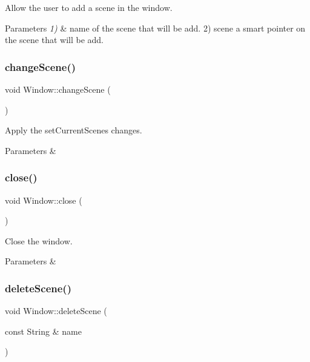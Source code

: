 Allow the user to add a scene in the window. 


\begin{DoxyParams}{Parameters}
{\em 1)} & \textquotesingle{}name\textquotesingle{} of the scene that will be add. 2) \textquotesingle{}scene\textquotesingle{} a smart pointer on the scene that will be add. \\
\hline
\end{DoxyParams}
\mbox{\label{classWindow_af1b2a635ce47d9e841445b8b866a3b28}} 
\subsubsection{\texorpdfstring{change\+Scene()}{changeScene()}}
{\footnotesize\ttfamily void Window\+::change\+Scene (\begin{DoxyParamCaption}{ }\end{DoxyParamCaption})}



Apply the set\+Current\+Scene\textquotesingle{}s changes. 


\begin{DoxyParams}{Parameters}
{\em } & \\
\hline
\end{DoxyParams}
\mbox{\label{classWindow_a35055c04498121d39741bfcd5082705b}} 
\subsubsection{\texorpdfstring{close()}{close()}}
{\footnotesize\ttfamily void Window\+::close (\begin{DoxyParamCaption}{ }\end{DoxyParamCaption})}



Close the window. 


\begin{DoxyParams}{Parameters}
{\em } & \\
\hline
\end{DoxyParams}
\mbox{\label{classWindow_ad3a1ead02eca314e2df94e3e932fb5ae}} 
\subsubsection{\texorpdfstring{delete\+Scene()}{deleteScene()}}
{\footnotesize\ttfamily void Window\+::delete\+Scene (\begin{DoxyParamCaption}\item[{const String \&}]{name }\end{DoxyParamCaption})}



